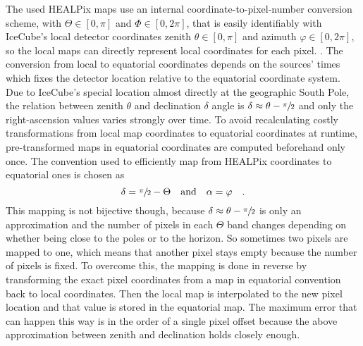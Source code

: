 The used HEALPix maps use an internal coordinate-to-pixel-number conversion scheme, with $\Theta\in[0, \pi]$ and $\Phi\in[0, 2\pi]$, that is easily identifiably with IceCube's local detector coordinates zenith $\theta\in[0, \pi]$ and azimuth $\varphi\in[0, 2\pi]$, so the local maps can directly represent local coordinates for each pixel.
.
The conversion from local to equatorial coordinates depends on the sources' times which fixes the detector location relative to the equatorial coordinate system.
Due to IceCube's special location almost directly at the geographic South Pole, the relation between zenith $\theta$ and declination $\delta$ angle is $\delta \approx \theta - \sfrac{\pi}{2}$ and only the right-ascension values varies strongly over time.
To avoid recalculating costly transformations from local map coordinates to equatorial coordinates at runtime, pre-transformed maps in equatorial coordinates are computed beforehand only once.
The convention used to efficiently map from HEALPix coordinates to equatorial ones is chosen as
\begin{equation}
  \delta = \sfrac{\pi}{2} - \Theta \quad\text{and}\quad \alpha = \varphi
  \quad\text{.}
\end{equation}
This mapping is not bijective though, because $\delta \approx \theta - \sfrac{\pi}{2}$ is only an approximation and the number of pixels in each $\Theta$ band changes depending on whether being close to the poles or to the horizon.
So sometimes two pixels are mapped to one, which means that another pixel stays empty because the number of pixels is fixed.
To overcome this, the mapping is done in reverse by transforming the exact pixel coordinates from a map in equatorial convention back to local coordinates.
Then the local map is interpolated to the new pixel location and that value is stored in the equatorial map.
The maximum error that can happen this way is in the order of a single pixel offset because the above approximation between zenith and declination holds closely enough.

